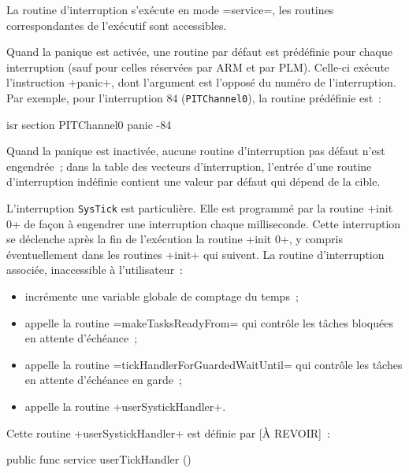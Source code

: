 La routine d'interruption s'exécute en mode \plm=service=, les routines correspondantes de l'exécutif sont accessibles. 








Quand la panique est activée, une routine par défaut est prédéfinie pour chaque interruption (sauf pour celles réservées par ARM et par PLM). Celle-ci exécute l'instruction \plm+panic+, dont l'argument est l'opposé du numéro de l'interruption. Par exemple, pour l'interruption $84$ (\texttt{PITChannel0}), la routine prédéfinie est~:

\begin{PLM}
isr section PITChannel0 {
  panic -84
}
\end{PLM}



Quand la panique est inactivée, aucune routine d'interruption pas défaut n'est engendrée~; dans la table des vecteurs d'interruption, l'entrée d'une routine d'interruption indéfinie contient une valeur par défaut qui dépend de la cible.






L'interruption \texttt{SysTick} est particulière. Elle est programmé par la routine \plm+init 0+ de façon à engendrer une interruption chaque milliseconde. Cette interruption se déclenche après la fin de l'exécution la routine \plm+init 0+, y compris éventuellement dans les routines \plm+init+ qui suivent. La routine d'interruption associée, inaccessible à l'utilisateur~:
\begin{itemize}
  \item incrémente une variable globale de comptage du temps~;
  \item appelle la routine \plm=makeTasksReadyFrom= qui contrôle les tâches bloquées en attente d'échéance~; 
  \item appelle la routine \plm=tickHandlerForGuardedWaitUntil= qui contrôle les tâches en attente d'échéance en garde~; 
  \item appelle la routine \plm+userSystickHandler+.
\end{itemize}

Cette routine \plm+userSystickHandler+ est définie par [À REVOIR]~:

\begin{PLM}
public func service userTickHandler () {
}
\end{PLM}




